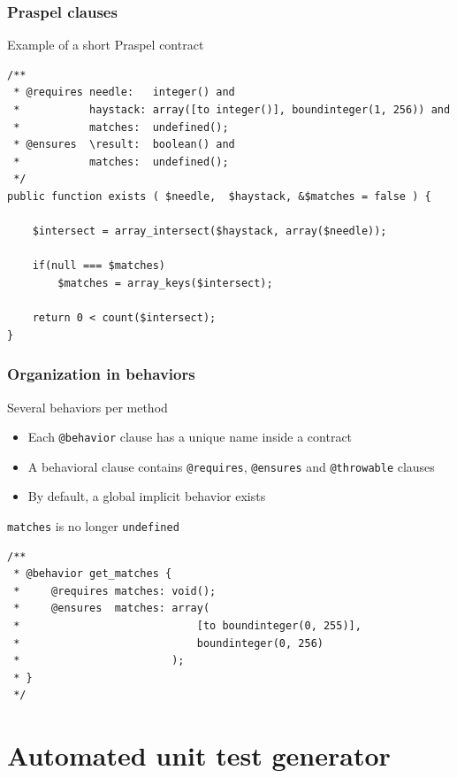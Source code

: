 \documentclass[10pt]{beamer}
\newcommand{\code}[1]{\texttt{#1}}
\begin{document}
\begin{frame}[fragile]
\frametitle{Praspel clauses}

\begin{exampleblock}{Example of a short Praspel contract}
{
\scriptsize
\begin{verbatim}
/**
 * @requires needle:   integer() and
 *           haystack: array([to integer()], boundinteger(1, 256)) and
 *           matches:  undefined();
 * @ensures  \result:  boolean() and
 *           matches:  undefined();
 */
public function exists ( $needle,  $haystack, &$matches = false ) {

    $intersect = array_intersect($haystack, array($needle));

    if(null === $matches)
        $matches = array_keys($intersect);

    return 0 < count($intersect);
}
\end{verbatim}
}
\end{exampleblock}

\end{frame}

\begin{frame}[fragile]
\frametitle{Organization in behaviors}

\begin{block}{Several behaviors per method}
\begin{itemize}
\item Each \code{@behavior} clause has a unique name inside a contract
\item A behavioral clause contains \code{@requires}, \code{@ensures} and
\code{@throwable} clauses
\item By default, a global implicit behavior exists
\end{itemize}
\end{block}

\begin{exampleblock}{\code{matches} is no longer \code{undefined}}
{
\scriptsize
\begin{verbatim}
/**
 * @behavior get_matches {
 *     @requires matches: void();
 *     @ensures  matches: array(
 *                            [to boundinteger(0, 255)],
 *                            boundinteger(0, 256)
 *                        );
 * }
 */
\end{verbatim}
}
\end{exampleblock}

\end{frame}

\section{Automated unit test generator}
\end{document}
